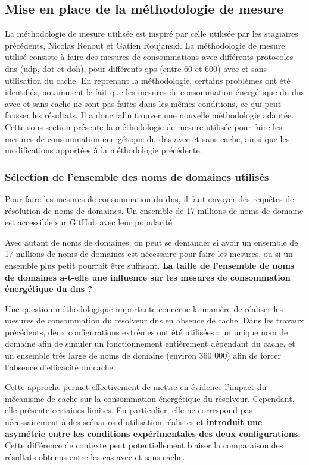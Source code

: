 \documentclass[12pt, a4paper]{report}
\begin{document}
	\subsection{Mise en place de la méthodologie de mesure}

	La méthodologie de mesure utilisée est inspiré par celle utilisée par les stagiaires précédents, Nicolas Renout et Gatien Roujanski. La méthodologie de mesure utilisé consiste à faire des mesures de consommations avec différents protocoles \gls{dns} (\gls{udp}, \gls{dot} et \gls{doh}), pour différents \gls{qps} (entre 60 et 600) avec et sans utilisation du cache.
	En reprenant la méthodologie, certains problèmes ont été identifiés, notamment le fait que les mesures de consommation énergétique du \gls{dns} avec et sans cache ne sont pas faites dans les mêmes conditions, ce qui peut fausser les résultats. Il a donc fallu trouver une nouvelle méthodologie adaptée.
	Cette sous-section présente la méthodologie de mesure utilisée pour faire les mesures de consommation énergétique du \gls{dns} avec et sans cache, ainsi que les modifications apportées à la méthodologie précédente.
	
	\subsubsection{Sélection de l'ensemble des noms de domaines utilisés}
	
	Pour faire les mesures de consommation du \gls{dns}, il faut envoyer des requêtes de résolution de noms de domaines. Un ensemble de 17 millions de noms de domaine est accessible sur GitHub avec leur popularité \cite{DomainNameDataset}. 

	Avec autant de noms de domaines, on peut se demander si avoir un ensemble de 17 millions de noms de domaines est nécessaire pour faire les mesures, ou si un ensemble plus petit pourrait être suffisant. \textbf{La taille de l'ensemble de noms de domaines a-t-elle une influence sur les mesures de consommation énergétique du \gls{dns} ?} 

	Une question méthodologique importante concerne la manière de réaliser les mesures de consommation du résolveur \gls{dns} en absence de cache. Dans les travaux précédents, deux configurations extrêmes ont été utilisées : un unique nom de domaine afin de simuler un fonctionnement entièrement dépendant du cache, et un ensemble très large de noms de domaine (environ 360 000) afin de forcer l'absence d'efficacité du cache.

	Cette approche permet effectivement de mettre en évidence l'impact du mécanisme de cache sur la consommation énergétique du résolveur. Cependant, elle présente certaines limites. En particulier, elle ne correspond pas nécessairement à des scénarios d'utilisation réalistes et \textbf{introduit une asymétrie entre les conditions expérimentales des deux configurations.} Cette différence de contexte peut potentiellement biaiser la comparaison des résultats obtenus entre les cas avec et sans cache.
\end{document}
